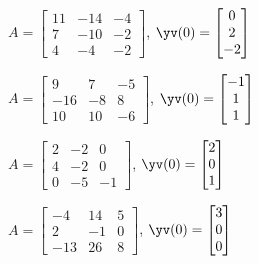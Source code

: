 \begin{exercise}
\begin{Parts}
\item \(A=\begin{bmatrix} 11 & -14 & -4
\\7 & -10 & -2
\\4 & -4 & -2 \end{bmatrix}\), 
\(\yv(0)=\begin{bmatrix} 0
\\2
\\-2 \end{bmatrix}\)

\item \(A=\begin{bmatrix} 9 & 7 & -5
\\-16 & -8 & 8
\\10 & 10 & -6 \end{bmatrix}\), 
\(\yv(0)=\begin{bmatrix} -1
\\1
\\1 \end{bmatrix}\)

\begin{OmitV1}
\item \(A=\begin{bmatrix} 2 & -2 & 0
\\4 & -2 & 0
\\0 & -5 & -1 \end{bmatrix}\), 
\(\yv(0)=\begin{bmatrix} 2
\\0
\\1 \end{bmatrix}\)

\item \(A=\begin{bmatrix} -4 & 14 & 5
\\2 & -1 & 0
\\-13 & 26 & 8 \end{bmatrix}\), 
\(\yv(0)=\begin{bmatrix} 3
\\0
\\0 \end{bmatrix}\)
\end{OmitV1}


\end{Parts}
\end{exercise}






